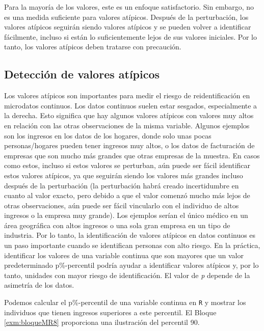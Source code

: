 \documentclass[
]{book}
\theoremstyle{definition}
\theoremstyle{definition}
\theoremstyle{definition}
\theoremstyle{definition}
\theoremstyle{remark}
\begin{document}
Para la mayoría de los valores, este es un enfoque satisfactorio. Sin embargo, no es una medida suficiente para valores atípicos. Después de la perturbación, los valores atípicos seguirán siendo valores atípicos y se pueden volver a identificar fácilmente, incluso si están lo suficientemente lejos de sus valores iniciales. Por lo tanto, los valores atípicos deben tratarse con precaución.

\hypertarget{detecciuxf3n-de-valores-atuxedpicos}{%
\subsection{Detección de valores atípicos}\label{detecciuxf3n-de-valores-atuxedpicos}}

Los valores atípicos son importantes para medir el riesgo de reidentificación en microdatos continuos. Los datos continuos suelen estar sesgados, especialmente a la derecha. Esto significa que hay algunos valores atípicos con valores muy altos en relación con las otras observaciones de la misma variable. Algunos ejemplos son los ingresos en los datos de los hogares, donde solo unas pocas personas/hogares pueden tener ingresos muy altos, o los datos de facturación de empresas que son mucho más grandes que otras empresas de la muestra. En casos como estos, incluso si estos valores se perturban, aún puede ser fácil identificar estos valores atípicos, ya que seguirán siendo los valores más grandes incluso después de la perturbación (la perturbación habrá creado incertidumbre en cuanto al valor exacto, pero debido a que el valor comenzó mucho más lejos de otras observaciones, aún puede ser fácil vincularlo con el individuo de altos ingresos o la empresa muy grande). Los ejemplos serían el único médico en un área geográfica con altos ingresos o una sola gran empresa en un tipo de industria. Por lo tanto, la identificación de valores atípicos en datos continuos es un paso importante cuando se identifican personas con alto riesgo. En la práctica, identificar los valores de una variable continua que son mayores que un valor predeterminado p\%-percentil podría ayudar a identificar valores atípicos y, por lo tanto, unidades con mayor riesgo de identificación. El valor de \emph{p} depende de la asimetría de los datos.

Podemos calcular el p\%-percentil de una variable continua en \texttt{R} y mostrar los individuos que tienen ingresos superiores a este percentil. El Bloque \ref{exm:bloqueMR8} proporciona una ilustración del percentil 90.
\end{document}
